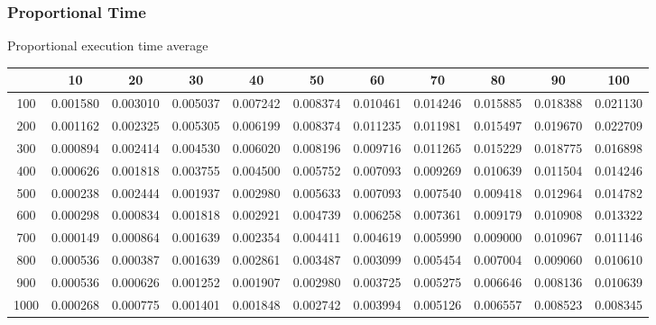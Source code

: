 \documentclass[12]{beamer}
\begin{document}
\begin{frame}
\frametitle{Proportional Time }

Proportional execution time average
\begin{center}
\begin{adjustbox}{max width=\textwidth}
\small
\begin{tabular}{ |c|c|c|c|c|c|c|c|c|c|c|}
\hline
  & 10 & 20 & 30 & 40 & 50 & 60 & 70 & 80 & 90 & 100 \\ 
\hline
 100 & 0.001580 & 0.003010 & 0.005037 & 0.007242 & 0.008374 & 0.010461 & 0.014246 & 0.015885 & 0.018388 & 0.021130 \\ 
\hline
 200 & 0.001162 & 0.002325 & 0.005305 & 0.006199 & 0.008374 & 0.011235 & 0.011981 & 0.015497 & 0.019670 & 0.022709 \\ 
\hline
 300 & 0.000894 & 0.002414 & 0.004530 & 0.006020 & 0.008196 & 0.009716 & 0.011265 & 0.015229 & 0.018775 & 0.016898 \\ 
\hline
 400 & 0.000626 & 0.001818 & 0.003755 & 0.004500 & 0.005752 & 0.007093 & 0.009269 & 0.010639 & 0.011504 & 0.014246 \\ 
\hline
 500 & 0.000238 & 0.002444 & 0.001937 & 0.002980 & 0.005633 & 0.007093 & 0.007540 & 0.009418 & 0.012964 & 0.014782 \\ 
\hline
 600 & 0.000298 & 0.000834 & 0.001818 & 0.002921 & 0.004739 & 0.006258 & 0.007361 & 0.009179 & 0.010908 & 0.013322 \\ 
\hline
 700 & 0.000149 & 0.000864 & 0.001639 & 0.002354 & 0.004411 & 0.004619 & 0.005990 & 0.009000 & 0.010967 & 0.011146 \\ 
\hline
 800 & 0.000536 & 0.000387 & 0.001639 & 0.002861 & 0.003487 & 0.003099 & 0.005454 & 0.007004 & 0.009060 & 0.010610 \\ 
\hline
 900 & 0.000536 & 0.000626 & 0.001252 & 0.001907 & 0.002980 & 0.003725 & 0.005275 & 0.006646 & 0.008136 & 0.010639 \\ 
\hline
 1000 & 0.000268 & 0.000775 & 0.001401 & 0.001848 & 0.002742 & 0.003994 & 0.005126 & 0.006557 & 0.008523 & 0.008345 \\ 
\hline
\end{tabular}
\end{adjustbox}
\end{center}

\end{frame}
\end{document}
